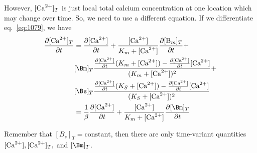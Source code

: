However, $[{\text{Ca}^{2+}}]_T$ is just local total calcium concentration at one location
which may change over time. So, we need to use a different equation.
If we
differentiate eq.~\eqref{eq:1079}, we have
\begin{equation}
  \label{eq:1078}
  \begin{split}
    \frac{\partial [\Ca]_T}{\partial t} &=
    \frac{\partial [\Ca]}{\partial t} +  \frac{[\Ca]}{K_m+[\Ca]} \frac{\partial
      [\ce{B_m}]_T}{\partial t} + \\
    &[\Bm]_T\frac{\frac{\partial
        [\Ca]}{\partial t}(K_m+[\Ca])-\frac{\partial [\Ca]}{\partial
        t}[\Ca]}{(K_m+[\Ca])^2} + \\
    &[\Bs]_T\frac{\frac{\partial
        [\Ca]}{\partial t}(K_S+[\Ca])-\frac{\partial [\Ca]}{\partial
        t}[\Ca]}{(K_S+[\Ca])^2} \\
    &=  \frac{1}{\beta} \frac{\partial [\Ca]}{\partial
      t} + \frac{[\Ca]}{K_m+[\Ca]}\frac{\partial [\Bm]_T}{\partial t}
  \end{split}
\end{equation}

Remember that $[B_s]_T=\text{constant}$, then there are only
time-variant quantities $[{\text{Ca}^{2+}}], [{\text{Ca}^{2+}}]_T,$ and $ [\Bm]_T$.  

